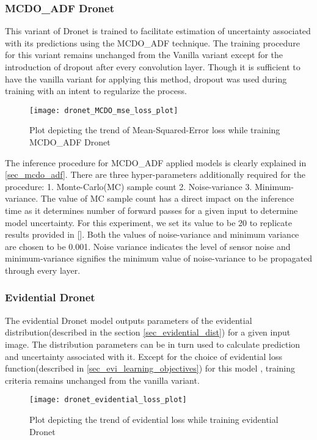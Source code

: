 \subsubsection{MCDO\_ADF Dronet}
This variant of Dronet is trained to facilitate estimation of uncertainty associated with its predictions using the MCDO\_ADF technique. The training procedure for this variant remains unchanged from the Vanilla variant except for the  introduction of dropout after every convolution layer. Though it is sufficient to have the vanilla variant for applying this method, dropout was used during training with an intent to regularize the process.
\begin{figure}[h]
	\centering
	\texttt{[image: dronet\_MCDO\_mse\_loss\_plot]}
	\caption{Plot depicting the trend of Mean-Squared-Error loss while training MCDO\_ADF Dronet}
	\label{fig_mse_loss_mcdo_dronet}
\end{figure}

The inference procedure for MCDO\_ADF applied models is clearly explained in \ref{sec_mcdo_adf}. There are three hyper-parameters additionally required for the procedure: 1. Monte-Carlo(MC) sample count 2. Noise-variance 3. Minimum-variance. The value of MC sample count has a direct impact on the inference time as it determines number of forward passes for a given input to determine model uncertainty. For this experiment, we set its value to be 20 to replicate results provided in []. Both the values of noise-variance and minimum variance are chosen to be 0.001. Noise variance indicates the level of sensor noise and minimum-variance signifies the minimum value of noise-variance to be propagated through every layer.

\subsubsection{Evidential Dronet}
The evidential Dronet model outputs parameters of the evidential distribution(described in the section \ref{sec_evidential_dist}) for a given input image. The distribution parameters can be in turn used to calculate prediction and uncertainty associated with it. Except for the choice of evidential loss function(described in \ref{sec_evi_learning_objectives}) for this model , training criteria remains unchanged from the vanilla variant.
\begin{figure}[h!]
	\centering
	\texttt{[image: dronet\_evidential\_loss\_plot]}
	\caption{Plot depicting the trend of evidential loss while training evidential Dronet}
	\label{fig_mse_loss_mcdo_dronet}
\end{figure}

